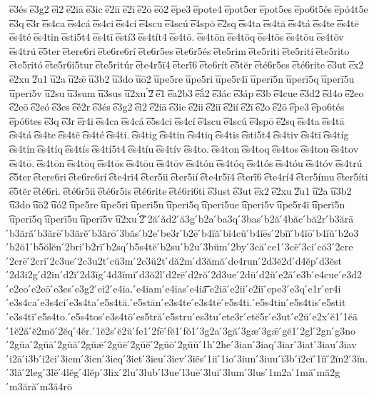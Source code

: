 {͞e3és
͞e3g2
͞ei2
͞e2iā
͞e3ic
͞e2iī
͞e2ī
͞e2ō
͞eó2
͞epe3
͞epote4
͞epot5er
͞epot5es
͞epo6t5és
͞epó4t5e
͞e3q
͞e3r
͞es4ca
͞es4cá
͞es4ci
͞es4cí
͞e4scu
͞e4scú
͞e4spō
͞e2sq
͞es4ta
͞es4tā
͞es4tá
͞es4te
͞es4tē
͞es4té
͞es4tin
͞esti5t4
͞es4tī
͞estí3
͞es4tít4
͞es4tō.
͞es4tōn
͞es4tōq
͞es4tōs
͞es4tōu
͞es4tōv
͞es4trú
͞e5ter
͞etere6ri
͞ete6re6rí
͞ete6r5es
͞ete6r5és
͞ete5rim
͞ete5riti
͞ete5rití
͞ete5rito
͞ete5ritó
͞ete5r6i5tur
͞ete5ritúr
͞ete4r5ī4
͞eterī́6
͞ete6rít
͞e5tĕr
͞eté6r5es
͞eté6rite
͞e3ut
͞ex2
͞e2xu
͞2u1
͞u2a
͞u2ǣ
͞u3b2
͞u3do
͞uō2
͞upe5re
͞upe5ri
͞upe5r4ī
͞uperī5n
͞uperī5q
͞uperī5u
͞uperī5v
͞u2su
͞u3sum
͞u3sus
͞u2xu
́͞2
͡e1
͡ea2b3
͡eắ2
͡e3ác
͡e3áp
͡e3b
͡e4cue
͡e3d2
͡ed4o
͡e2eo
͡e2eō
͡e2eó
͡e3es
͡eé2r
͡e3és
͡e3g2
͡ei2
͡e2iā
͡e3ic
͡e2ii
͡e2iī
͡e2ií
͡e2ī
͡e2o
͡e2ō
͡epe3
͡epo6tés
͡epó6tes
͡e3q
͡e3r
͡er4i
͡es4ca
͡es4cá
͡e5s4ci
͡es4cí
͡e4scu
͡e4scú
͡e4spō
͡e2sq
͡es4ta
͡es4tā
͡es4tá
͡es4te
͡es4tē
͡es4té
͡es4ti.
͡es4tig
͡es4tin
͡es4tiq
͡es4tis
͡esti5t4
͡es4tiv
͡es4tī
͡es4tíg
͡es4tín
͡es4tíq
͡es4tís
͡es4tí5t4
͡es4tíu
͡es4tív
͡es4to.
͡es4ton
͡es4toq
͡es4tos
͡es4tou
͡es4tov
͡es4tō.
͡es4tōn
͡es4tōq
͡es4tōs
͡es4tōu
͡es4tōv
͡es4tón
͡es4tóq
͡es4tós
͡es4tóu
͡es4tóv
͡es4trú
͡e5ter
͡etere6ri
͡ete6re6rí
͡ete4ri4
͡eter5ii
͡eter5ií
͡ete4r5ī4
͡eterī́6
͡ete4rí4
͡eter5ímu
͡eter5íti
͡e5tĕr
͡eté6ri.
͡eté6r5ii
͡eté6r5is
͡eté6rite
͡eté6ri6ti
͡e3ust
͡e3ut
͡ex2
͡e2xu
͡2u1
͡u2a
͡u3b2
͡u3do
͡uō2
͡uó2
͡upe5re
͡upe5ri
͡uperi5n
͡uperi5q
͡uperi5ue
͡uperi5v
͡upe5r4ī
͡uperī5n
͡uperī5q
͡uperī5u
͡uperī5v
͡u2xu
́͡2
́2ă
́ăd2
́ă3g
́b2a
́ba3q
́3bas
́b2ă
́4băc
́bă2r
́b3ărā
́b3ără
́b3ărē
́b3ărĕ
́b3ărō
́3băs
́b2e
́be3r
́b2ē
́b4ĭă
́bĭ4cŭ
́b4ĭēs
́2bĭĭ
́b4ĭō
́b4ĭŭ
́b2o3
́b2ŏ1
́b5ŏlĕn
́2bri
́b2rī
́b2sq
́b5s4tĕ
́b2su
́b2u
́3bŭm
́2by
́3că
́ce1
́3cē
́3ci
́cŏ3
́2cre
́2crē
́2cri
́2c3ue
́2c3u2t
́cŭ3m
́2c3ŭ2t
́dă2m
́d3ămă
́de4run
́2d3ĕ2d
́d4ĕp
́d3ĕst
́2d3i2g
́d2in
́d2ĭ
́2d3ĭg
́4d3ĭmĭ
́d3ŏ2l
́d2rē
́d2rŏ
́2d3ue
́2dū
́d2ŭ
́e2ă
́e3b
́e4cue
́e3d2
́e2eo
́e2eō
́e3es
́e3g2
́ei2
́e4ia.
́e4iam
́e4ias
́e4ia͞
́e2iā
́e2ii
́e2iī
́epe3
́e3q
́e1r
́er4i
́e3s4ca
́e3s4ci
́e3s4ta
́e5s4tā.
́e5stān
́e3s4te
́e3s4tē
́e5s4ti.
́e5s4tin
́e5s4tis
́e5stit
́e3s4tī
́e5s4to.
́e5s4tos
́e3s4tō
́es5tră
́e5stru
́es3tu
́ete3r
́etĕ5r
́e3ut
́e2ŭ
́e2x
́ĕ1
́1ĕā
́1ĕ2ă
́ĕ2mŏ
́2ĕq
́4ĕr.
́1ĕ2s
́ĕ2ŭ
́fe1
́2fē
́fĕ1
́fŏ1
́3g2a
́3gă
́3gæ
́3gǣ
́gĕ1
́2gl
́2gn
́g3no
́2gŭa
́2gŭā
́2gŭă
́2gŭǣ
́2gŭē
́2gŭĕ
́2gŭō
́2gŭŭ
́1h
́2he
́3ian
́3iaq
́3iar
́3iat
́3iau
́3iav
́i2ā
́i3b
́i2ci
́3iem
́3ien
́3ieq
́3iet
́3ieu
́3iev
́3iēs
́1ii
́1io
́3iun
́3iuu
́ĭ3b
́ĭ2cĭ
́1ĭĭ
́2ĭn2
́3ĭn.
́3lă
́2leg
́3lĕ
́4lĕg
́4lĕp
́3lix
́2lu
́3lub
́l3ue
́l3uē
́3lui
́3lum
́3lus
́1m2a
́1mă
́mă2g
́m3ără
́m3ă4rō
}
